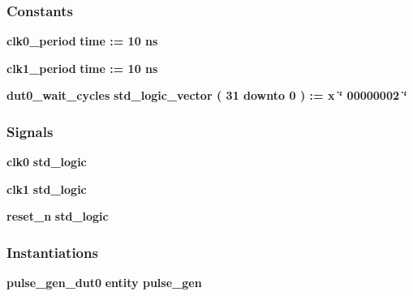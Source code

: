 \subsubsection*{Constants}
 \begin{DoxyCompactItemize}
\item 
{\bf clk0\+\_\+period} {\bfseries \textcolor{comment}{time}\textcolor{vhdlchar}{ }\textcolor{vhdlchar}{ }\textcolor{vhdlchar}{\+:}\textcolor{vhdlchar}{=}\textcolor{vhdlchar}{ }\textcolor{vhdlchar}{ }\textcolor{vhdlchar}{ } \textcolor{vhdldigit}{10} \textcolor{vhdlchar}{ }\textcolor{vhdlchar}{ns}\textcolor{vhdlchar}{ }} 
\item 
{\bf clk1\+\_\+period} {\bfseries \textcolor{comment}{time}\textcolor{vhdlchar}{ }\textcolor{vhdlchar}{ }\textcolor{vhdlchar}{\+:}\textcolor{vhdlchar}{=}\textcolor{vhdlchar}{ }\textcolor{vhdlchar}{ }\textcolor{vhdlchar}{ } \textcolor{vhdldigit}{10} \textcolor{vhdlchar}{ }\textcolor{vhdlchar}{ns}\textcolor{vhdlchar}{ }} 
\item 
{\bf dut0\+\_\+wait\+\_\+cycles} {\bfseries \textcolor{comment}{std\+\_\+logic\+\_\+vector}\textcolor{vhdlchar}{ }\textcolor{vhdlchar}{(}\textcolor{vhdlchar}{ }\textcolor{vhdlchar}{ } \textcolor{vhdldigit}{31} \textcolor{vhdlchar}{ }\textcolor{keywordflow}{downto}\textcolor{vhdlchar}{ }\textcolor{vhdlchar}{ } \textcolor{vhdldigit}{0} \textcolor{vhdlchar}{ }\textcolor{vhdlchar}{)}\textcolor{vhdlchar}{ }\textcolor{vhdlchar}{ }\textcolor{vhdlchar}{ }\textcolor{vhdlchar}{\+:}\textcolor{vhdlchar}{=}\textcolor{vhdlchar}{ }\textcolor{vhdlchar}{ }\textcolor{vhdlchar}{x}\textcolor{vhdlchar}{ }\textcolor{keyword}{\char`\"{} 00000002 \char`\"{}}\textcolor{vhdlchar}{ }} 
\end{DoxyCompactItemize}
\subsubsection*{Signals}
 \begin{DoxyCompactItemize}
\item 
{\bf clk0} {\bfseries \textcolor{comment}{std\+\_\+logic}\textcolor{vhdlchar}{ }} 
\item 
{\bf clk1} {\bfseries \textcolor{comment}{std\+\_\+logic}\textcolor{vhdlchar}{ }} 
\item 
{\bf reset\+\_\+n} {\bfseries \textcolor{comment}{std\+\_\+logic}\textcolor{vhdlchar}{ }} 
\end{DoxyCompactItemize}
\subsubsection*{Instantiations}
 \begin{DoxyCompactItemize}
\item 
{\bf pulse\+\_\+gen\+\_\+dut0}  {\bfseries entity pulse\+\_\+gen}   
\end{DoxyCompactItemize}


